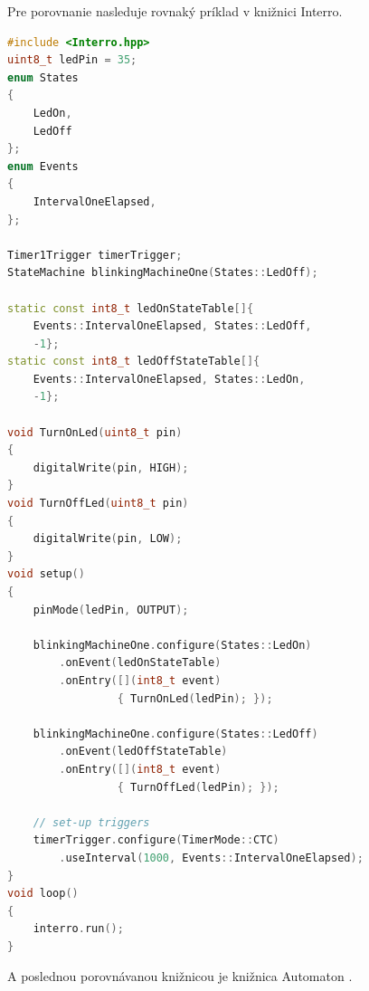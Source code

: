Pre porovnanie nasleduje rovnaký príklad v knižnici Interro.
\begin{lstlisting}[language=c++]      
#include <Interro.hpp>
uint8_t ledPin = 35;
enum States
{
    LedOn,
    LedOff
};
enum Events
{
    IntervalOneElapsed,
};

Timer1Trigger timerTrigger;
StateMachine blinkingMachineOne(States::LedOff);

static const int8_t ledOnStateTable[]{
    Events::IntervalOneElapsed, States::LedOff,
    -1};
static const int8_t ledOffStateTable[]{
    Events::IntervalOneElapsed, States::LedOn,
    -1};

void TurnOnLed(uint8_t pin)
{
    digitalWrite(pin, HIGH);
}
void TurnOffLed(uint8_t pin)
{
    digitalWrite(pin, LOW);
}
void setup()
{
    pinMode(ledPin, OUTPUT);

    blinkingMachineOne.configure(States::LedOn)
        .onEvent(ledOnStateTable)
        .onEntry([](int8_t event)
                 { TurnOnLed(ledPin); });

    blinkingMachineOne.configure(States::LedOff)
        .onEvent(ledOffStateTable)
        .onEntry([](int8_t event)
                 { TurnOffLed(ledPin); });

    // set-up triggers
    timerTrigger.configure(TimerMode::CTC)
        .useInterval(1000, Events::IntervalOneElapsed);
}
void loop()
{
    interro.run();
}
\end{lstlisting}
A poslednou porovnávanou knižnicou je knižnica Automaton \cite{tinkerspyAutomaton2021}.

